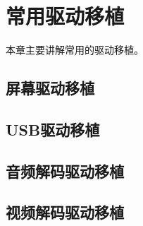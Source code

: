 \chapter{常用驱动移植}
本章主要讲解常用的驱动移植。


\section{屏幕驱动移植}



\section{USB驱动移植}



\section{音频解码驱动移植}




\section{视频解码驱动移植}


